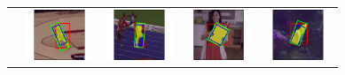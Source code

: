\setlength{\tabcolsep}{0.25ex}

\begin{tabular}
{c cccc}
& \includegraphics[trim={2cm 0cm 2cm 0cm},clip,width = 0.79in]{img/bbox/00435}
& \includegraphics[trim={2cm 0cm 2cm 0cm},clip,width = 0.79in]{img/bbox/02411}
& \includegraphics[trim={2cm 0cm 2cm 0cm},clip,width = 0.79in]{img/bbox/03046}
& \includegraphics[trim={2cm 0cm 2cm 0cm},clip,width = 0.79in]{img/bbox/06761}
\\


\end{tabular}
